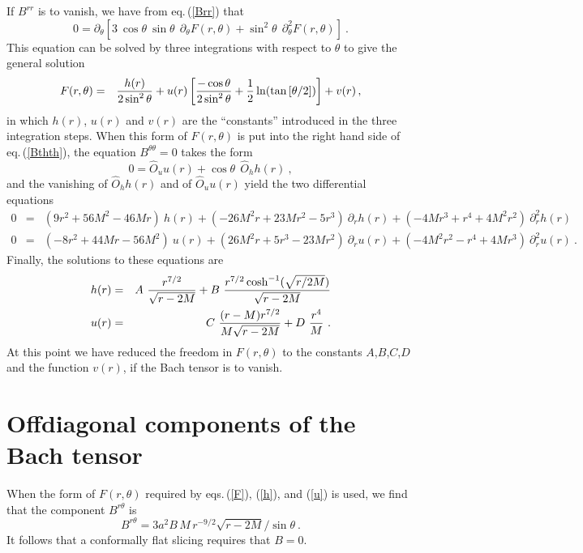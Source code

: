 If $B^{rr}$
is to vanish, we have from eq.\,(\ref{Brr})
that
\begin{equation}
0 = \partial_{\theta}\left[ 3 \: \cos\theta \: \sin\theta \:\:
\partial_{\theta}F(r,\theta) + \sin^2\theta \:\: \partial^2_{\theta}F(r,\theta)
\right]\ . 
\end{equation}
This equation can be solved by three integrations with respect to $\theta$
to give the general solution
\begin{eqnarray}
F(r,\theta) &=& {h(r) \over 2\sin^2\theta} + u(r) 
\left[ {-\cos\theta \over 2\sin^2\theta} + \frac{1}{2}
\ln(\tan\left[\theta/2\right]) \right] + v(r)\label{F}\,,
\end{eqnarray}
in which $h(r)$, $u(r)$ and $v(r)$ are the  ``constants'' 
introduced in the three integration steps.
When this form of $F(r,\theta)$ is put into the right hand
side of eq.\,(\ref{Bthth}), the equation $B^{\theta\theta}=0$ takes
the form
\begin{equation}
0 = \hat{O}_{u}u(r) + \cos{\theta} \:\: \hat{O}_{h}h(r)\ ,
\end{equation}
and the vanishing of $\hat{O}_{h}h(r)$ and of $\hat{O}_{u}u(r)$ yield the two
differential equations
\begin{eqnarray}
0 &=& (9r^2+56M^2-46Mr) \: h(r) + (-26M^2r+23Mr^2-5r^3) \: \partial_{r}h(r) 
+ (-4Mr^3+r^4+4M^2r^2) \:  \partial^2_{r}h(r) \label{heq}\\
0 &=& (-8r^2+44Mr-56M^2) \: u(r) + (26M^2r+5r^3-23Mr^2) \: \partial_{r}u(r) 
+ (-4M^2r^2-r^4+4Mr^3) \:  \partial^2_{r}u(r) \label{ueq}\ .
\end{eqnarray}
Finally, the solutions to these equations are
\begin{eqnarray}
h(r) &=& A\ { r^{7/2} \over \sqrt{r-2M}} + B\ {
 r^{7/2}\cosh^{-1}(\sqrt{r/2M})  \over  \sqrt{r-2M}}\label{h}\\
u(r) &=& C\ { (r-M) r^{7/2} \over M \sqrt{r-2M}} + 
 D\ {r^{4} \over M }\label{u}\ .
\end{eqnarray}
At this point we have reduced the freedom in 
$F(r,\theta)$ 
to the constants $A$,$B$,$C$,$D$ and the function $v(r)$, if the
Bach tensor is to vanish.
\section{Offdiagonal components of the Bach tensor}

When the form of $F(r,\theta)$ required by eqs.\,(\ref{F}), (\ref{h}),
and (\ref{u}) is used, we find that the component $B^{r\theta}$ is
\begin{equation}
B^{r\theta}= 3a^2B\,M\,r^{-9/2}\sqrt{r-2M}/ \sin\theta \label{Erth}\ .
\end{equation}
It follows that a conformally flat slicing requires that $B=0$.

